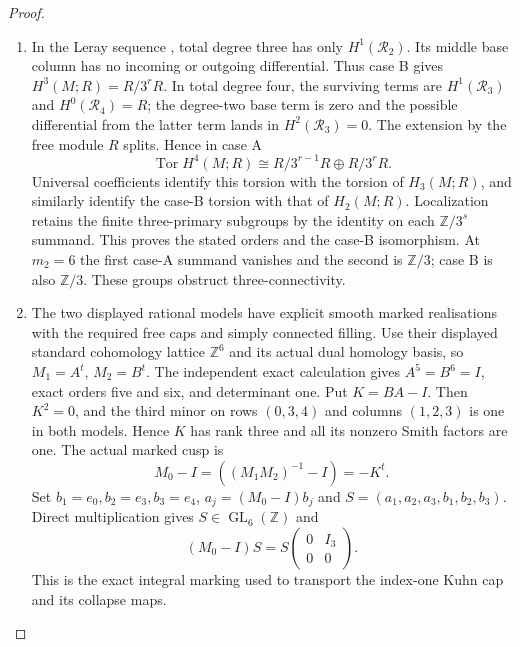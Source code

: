 \begin{proof}
\begin{enumerate}[label=\arabic*.]
For $q=2,3$ there is consequently an exact sequence
\[
 0\longrightarrow\mathcal R_q\longrightarrow j_*L_q
 \longrightarrow Q_q\longrightarrow0,
\]
where $Q_q$ is supported at the second finite point.  Since
$H^0(j_*L_q)=0$, its connecting map embeds $Q_q$ in
$H^1(\mathcal R_q)$, with the free quotient $H^1(j_*L_q)$
computed above.  Its torsion is exactly $Q_q$.
Also $H^2(\mathcal R_1)=H^2(\mathcal R_2)=H^2(\mathcal R_3)=0$.
Injectivity gives $H^0(\mathcal R_3)=0$.  The degree-four
free cusp kernel, together with $H^0(j_*L_4)=0$, gives
$H^0(\mathcal R_4)=R$.

\item In the Leray sequence
\cite[Tag~01F2, Lemma~20.13.4]{StacksProject}, total degree three
has only $H^1(\mathcal R_2)$.  Its middle base column has no
incoming or outgoing differential.  Thus case B gives
$H^3(M;R)=R/3^rR$.
In total degree four, the surviving terms are
$H^1(\mathcal R_3)$ and $H^0(\mathcal R_4)=R$;
the degree-two base term is zero and the possible differential
from the latter term lands in $H^2(\mathcal R_3)=0$.
The extension by the free module $R$ splits.  Hence in case A
\[
 \operatorname{Tor}H^4(M;R)
   \cong R/3^{r-1}R\oplus R/3^rR.
\]
Universal coefficients
\cite[Theorem~3.2, p.~195]{Hatcher2002} identify this torsion
with the torsion of $H_3(M;R)$, and similarly identify the
case-B torsion with that of $H_2(M;R)$.  Localization retains
the finite three-primary subgroups by the identity on each
$\mathbb Z/3^s$ summand.  This proves the stated orders and
the case-B isomorphism.  At $m_2=6$ the first case-A summand
vanishes and the second is $\mathbb Z/3$; case B is also
$\mathbb Z/3$.  These groups obstruct three-connectivity.
\item The two displayed rational models have explicit smooth marked
realisations with the required free caps and simply connected filling.
Use their displayed standard cohomology lattice $\mathbb Z^6$ and its
actual dual homology basis, so $M_1=A^t$, $M_2=B^t$.
The independent exact calculation gives $A^5=B^6=I$, exact orders five
and six, and determinant one. Put $K=BA-I$. Then $K^2=0$, and the
third minor on rows $(0,3,4)$ and columns $(1,2,3)$ is one in both
models. Hence $K$ has rank three and all its nonzero Smith factors
are one. The actual marked cusp is
\[
 M_0-I=((M_1M_2)^{-1}-I)=-K^t.
\]
Set $b_1=e_0,b_2=e_3,b_3=e_4$, $a_j=(M_0-I)b_j$ and
$S=(a_1,a_2,a_3,b_1,b_2,b_3)$. Direct multiplication gives
$S\in\operatorname{GL}_6(\mathbb Z)$ and
\[
 (M_0-I)S=S\begin{pmatrix}0&I_3\\0&0\end{pmatrix}.
\]
This is the exact integral marking used to transport the index-one
Kuhn cap and its collapse maps.


\end{enumerate}
\end{proof}
